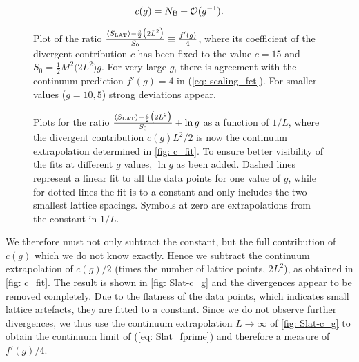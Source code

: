 %
%
\begin{equation}
c(g) = N_{\rm B} + \mathcal{O}(g^{-1}).
\end{equation}
%
%
\begin{figure}
\centering

\caption{Plot of the ratio $\frac{\langle S_{\rm LAT}\rangle -\frac{c}{2}\big(2L^{2}\big)}{S_{0}} \equiv \frac{f'(g)}{4}$, where its coefficient of the divergent contribution $c$ has been fixed to the value $c=15$ and $S_{0}=\frac{1}{2}M^{2}\big(2L^{2}\big)g$. For very large $g$, there is agreement with the continuum prediction $f'(g)=4$ in (\ref{eq: scaling_fct}). For smaller values ($g=10,5$) strong deviations appear.
\label{fig: Slat-c_fix}}
\end{figure}
%
%
\begin{figure}
\centering

\caption{Plots for the ratio $\frac{\langle S_{\rm LAT}\rangle -\frac{c}{2}\big(2L^{2}\big)}{S_{0}} + \ln g$ as a function of $1/L$, where the divergent contribution $c(g) L^{2}/2$ is now the continuum extrapolation determined in \autoref{fig: c_fit}. To ensure better visibility of the fits at different $g$ values, $\ln g$ as been added. Dashed lines represent a linear fit to all the data points for one value of $g$, while for dotted lines the fit is to a constant and only includes the two smallest lattice spacings. Symbols at zero are extrapolations from the constant in $1/L$.
\label{fig: Slat-c_g}}
\end{figure}
%
%
We therefore must not only subtract the constant, but the full contribution of $c(g)$ which we do not know exactly. Hence we subtract the continuum extrapolation of $c(g)/2$ (times the number of lattice points, $2L^{2}$), as obtained in \autoref{fig: c_fit}. The result is shown in \autoref{fig: Slat-c_g} and the divergences appear to be removed completely. Due to the flatness of the data points, which indicates small lattice artefacts, they are fitted to a  constant. Since we do not observe further divergences, we thus use the continuum extrapolation $L\to\infty$ of \autoref{fig: Slat-c_g} to obtain the continuum limit of (\ref{eq: Slat_fprime}) and therefore a measure of $f'(g)/4$.